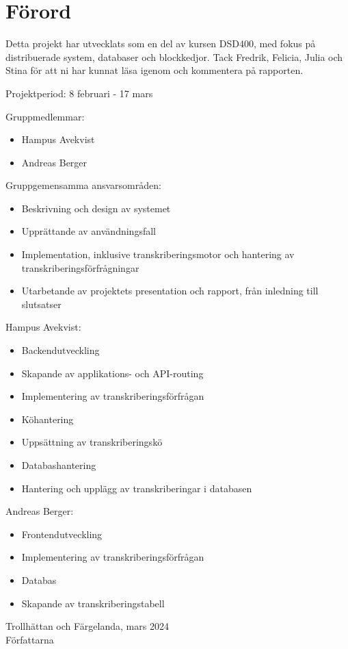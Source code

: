 \thispagestyle{plain}

\section{Förord}
Detta projekt har utvecklats som en del av kursen DSD400, med fokus på
distribuerade system, databaser och blockkedjor. Tack Fredrik, Felicia, Julia
och Stina för att ni har kunnat läsa igenom och kommentera på rapporten.

Projektperiod: 8 februari - 17 mars

Gruppmedlemmar:
\begin{itemize}
    \item Hampus Avekvist
    \item Andreas Berger
\end{itemize}

Gruppgemensamma ansvarsområden:
\begin{itemize}
    \item Beskrivning och design av systemet
    \item Upprättande av användningsfall
    \item Implementation, inklusive transkriberingsmotor och hantering av transkriberingsförfrågningar
    \item Utarbetande av projektets presentation och rapport, från inledning till slutsatser
\end{itemize}

Hampus Avekvist:
\begin{itemize}
    \item Backendutveckling
    \item Skapande av applikations- och API-routing
    \item Implementering av transkriberingsförfrågan
    \item Köhantering
    \item Uppsättning av transkriberingskö
    \item Databashantering
    \item Hantering och upplägg av transkriberingar i databasen
\end{itemize}

Andreas Berger:
\begin{itemize}
    \item Frontendutveckling
    \item Implementering av transkriberingsförfrågan
    \item Databas
    \item Skapande av transkriberingstabell
\end{itemize}

Trollhättan och Färgelanda, mars 2024 \\
Författarna
